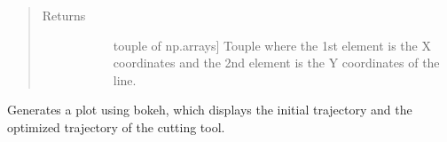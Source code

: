 \documentclass[letterpaper,10pt,english,openany,oneside]{sphinxmanual}
\begin{document}
\begin{fulllineitems}
\begin{fulllineitems}
\begin{quote}
\begin{description}
\item[{Returns}] \leavevmode\begin{description}
\item[{}] \leavevmode{[}touple of np.arrays{]}
Touple where the 1st element is the X coordinates and the 2nd
element is the Y coordinates of the line.

\end{description}

\end{description}\end{quote}

\end{fulllineitems}


\begin{fulllineitems}
\label{\detokenize{reference:cnc.visualization.Visualizer.visualize}}
Generates a plot using bokeh, which displays the initial trajectory and
the optimized trajectory of the cutting tool.

\end{fulllineitems}


\end{fulllineitems}



\renewcommand{\indexname}{Python Module Index}
\begin{sphinxtheindex}
\let\bigletter\sphinxstyleindexlettergroup
\bigletter{c}
\item\relax{}
\item\relax{}
\end{sphinxtheindex}

\renewcommand{\indexname}{Index}
\printindex
\end{document}
